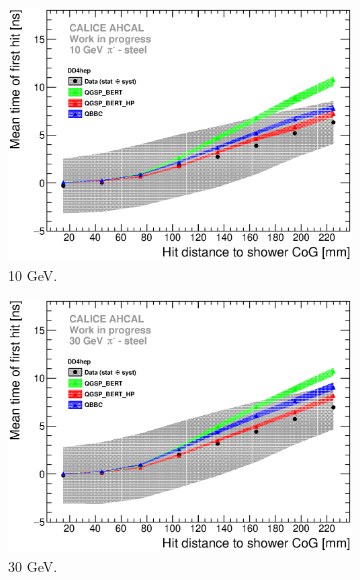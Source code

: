 \begin{figure}[htbp!]
  \begin{subfigure}[t]{0.49\textwidth}
    \centering
    \includegraphics[width=1\textwidth]{../Thesis_Plots/Timing/Pions/Plots/ComparisonToSim/Time_Radius_10GeV_SSF_DD4hep.eps}
    \caption{10 GeV.} \label{fig:Radius_SSF_SimData_10GeV_DD4hep}
  \end{subfigure}
  \hfill
  \begin{subfigure}[t]{0.49\textwidth}
    \centering
    \includegraphics[width=1\textwidth]{../Thesis_Plots/Timing/Pions/Plots/ComparisonToSim/Time_Radius_30GeV_SSF_DD4hep.eps}
    \caption{30 GeV.} \label{fig:Radius_SSF_SimData_30GeV_DD4hep}
  \end{subfigure}
  \hfill
  \begin{subfigure}[t]{0.49\textwidth}

\end{subfigure}
\end{figure}
